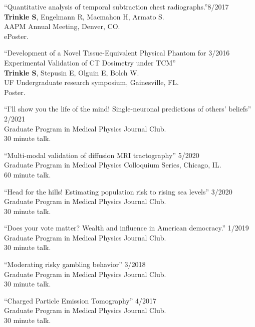 \documentclass[10pt,letterpaper]{article}
\begin{document}
\begin{benumerate}{6}
\item{``Quantitative analysis of temporal subtraction chest radiographs.''\hfill 8/2017\\
    \textbf{Trinkle S}, Engelmann R, Macmahon H, Armato S. \\
    AAPM Annual Meeting, Denver, CO. \\
    ePoster.}

\item{``Development of a Novel Tissue-Equivalent Physical Phantom for \hfill 3/2016\\
    Experimental Validation of CT Dosimetry under TCM'' \\
    \textbf{Trinkle S}, Stepusin E, Olguin E, Bolch W.\\
    UF Undergraduate research symposium, Gainesville, FL. \\
    Poster.}

\end{benumerate}

\begin{benumerate}{6}

\item {``I'll show you the life of the mind! Single-neuronal predictions of
    others' beliefs'' \hfill 2/2021\\
    Graduate Program in Medical Physics Journal Club. \\
    30 minute talk.
  }
\item{``Multi-modal validation of diffusion MRI tractography'' \hfill 5/2020\\
    Graduate Program in Medical Physics Colloquium Series, Chicago, IL.\\
    60 minute talk.}

\item{``Head for the hills! Estimating population risk to rising sea levels'' \hfill 3/2020\\
    Graduate Program in Medical Physics Journal Club. \\
    30 minute talk.}

\item{``Does your vote matter? Wealth and influence in American democracy.'' \hfill 1/2019\\
    Graduate Program in Medical Physics Journal Club. \\
    30 minute talk.}

\item{``Moderating risky gambling behavior'' \hfill 3/2018\\
    Graduate Program in Medical Physics Journal Club. \\
    30 minute talk.}
  
\item{``Charged Particle Emission Tomography'' \hfill 4/2017\\
    Graduate Program in Medical Physics Journal Club. \\
    30 minute talk.}

\end{benumerate}
\end{document}
